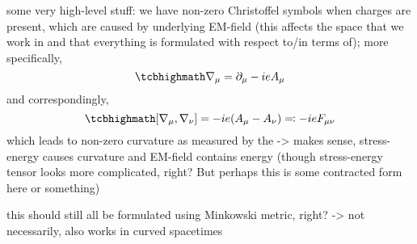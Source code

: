 \documentclass[../relativity_main.tex]{subfiles}
\begin{document}
some very high-level stuff: we have non-zero Christoffel symbols when charges are present, which are caused by underlying EM-field (this affects the space that we work in and that everything is formulated with respect to/in terms of); more specifically,
\begin{equation}\label{eq:cov_deriv_em}
	\eqbox{
	\nabla_\mu = \partial_\mu - i e A_\mu
	}
\end{equation}
and correspondingly,
\begin{equation}\label{eq:em_field_tensor_v2}
	\eqbox{
	\qty[\nabla_\mu, \nabla_\nu] = - i e (A_\mu - A_\nu) \eqqcolon - i e F_{\mu \nu}
	}
\end{equation}
which leads to non-zero curvature as measured by the  -> makes sense, stress-energy causes curvature and EM-field contains energy (though stress-energy tensor looks more complicated, right? But perhaps this is some contracted form here or something)

this should still all be formulated using Minkowski metric, right? -> not necessarily, also works in curved spacetimes
\end{document}
